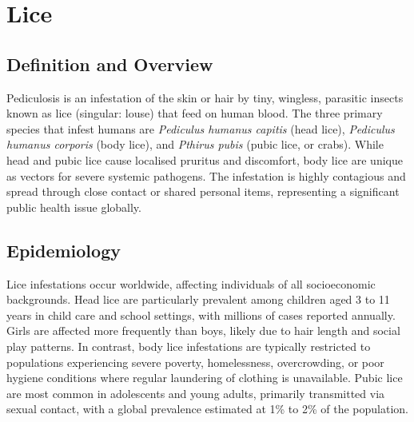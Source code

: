 \chapter{Lice}

\section*{Definition and Overview}
Pediculosis is an infestation of the skin or hair by tiny, wingless, parasitic insects known as lice (singular: louse) that feed on human blood. The three primary species that infest humans are \textit{Pediculus humanus capitis} (head lice), \textit{Pediculus humanus corporis} (body lice), and \textit{Pthirus pubis} (pubic lice, or crabs). While head and pubic lice cause localised pruritus and discomfort, body lice are unique as vectors for severe systemic pathogens. The infestation is highly contagious and spread through close contact or shared personal items, representing a significant public health issue globally.

\section*{Epidemiology}
Lice infestations occur worldwide, affecting individuals of all socioeconomic backgrounds. Head lice are particularly prevalent among children aged 3 to 11 years in child care and school settings, with millions of cases reported annually. Girls are affected more frequently than boys, likely due to hair length and social play patterns. In contrast, body lice infestations are typically restricted to populations experiencing severe poverty, homelessness, overcrowding, or poor hygiene conditions where regular laundering of clothing is unavailable. Pubic lice are most common in adolescents and young adults, primarily transmitted via sexual contact, with a global prevalence estimated at 1\% to 2\% of the population.

